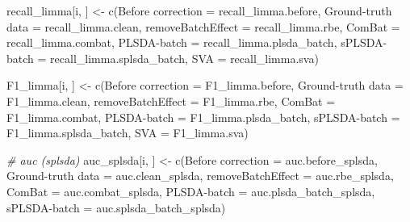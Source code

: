 \documentclass[
]{book}
\newenvironment{Shaded}{\begin{snugshade}}{\end{snugshade}}
\newcommand{\AttributeTok}[1]{\textcolor[rgb]{0.77,0.63,0.00}{#1}}
\newcommand{\CommentTok}[1]{\textcolor[rgb]{0.56,0.35,0.01}{\textit{#1}}}
\newcommand{\FunctionTok}[1]{\textcolor[rgb]{0.00,0.00,0.00}{#1}}
\newcommand{\NormalTok}[1]{#1}
\newcommand{\OtherTok}[1]{\textcolor[rgb]{0.56,0.35,0.01}{#1}}
\newcommand{\StringTok}[1]{\textcolor[rgb]{0.31,0.60,0.02}{#1}}
\begin{document}
\begin{Shaded}
\begin{Highlighting}[]
\NormalTok{  recall\_limma[i, ] }\OtherTok{\textless{}{-}} \FunctionTok{c}\NormalTok{(}\StringTok{\textasciigrave{}}\AttributeTok{Before correction}\StringTok{\textasciigrave{}} \OtherTok{=}\NormalTok{ recall\_limma.before, }
                         \StringTok{\textasciigrave{}}\AttributeTok{Ground{-}truth data}\StringTok{\textasciigrave{}} \OtherTok{=}\NormalTok{ recall\_limma.clean,}
                         \StringTok{\textasciigrave{}}\AttributeTok{removeBatchEffect}\StringTok{\textasciigrave{}} \OtherTok{=}\NormalTok{ recall\_limma.rbe,}
                         \AttributeTok{ComBat =}\NormalTok{ recall\_limma.combat,}
                         \StringTok{\textasciigrave{}}\AttributeTok{PLSDA{-}batch}\StringTok{\textasciigrave{}} \OtherTok{=}\NormalTok{ recall\_limma.plsda\_batch,}
                         \StringTok{\textasciigrave{}}\AttributeTok{sPLSDA{-}batch}\StringTok{\textasciigrave{}} \OtherTok{=}\NormalTok{ recall\_limma.splsda\_batch,}
                         \AttributeTok{SVA =}\NormalTok{ recall\_limma.sva)}
  
\NormalTok{  F1\_limma[i, ] }\OtherTok{\textless{}{-}} \FunctionTok{c}\NormalTok{(}\StringTok{\textasciigrave{}}\AttributeTok{Before correction}\StringTok{\textasciigrave{}} \OtherTok{=}\NormalTok{ F1\_limma.before, }
                     \StringTok{\textasciigrave{}}\AttributeTok{Ground{-}truth data}\StringTok{\textasciigrave{}} \OtherTok{=}\NormalTok{ F1\_limma.clean,}
                     \StringTok{\textasciigrave{}}\AttributeTok{removeBatchEffect}\StringTok{\textasciigrave{}} \OtherTok{=}\NormalTok{ F1\_limma.rbe,}
                     \AttributeTok{ComBat =}\NormalTok{ F1\_limma.combat,}
                     \StringTok{\textasciigrave{}}\AttributeTok{PLSDA{-}batch}\StringTok{\textasciigrave{}} \OtherTok{=}\NormalTok{ F1\_limma.plsda\_batch,}
                     \StringTok{\textasciigrave{}}\AttributeTok{sPLSDA{-}batch}\StringTok{\textasciigrave{}} \OtherTok{=}\NormalTok{ F1\_limma.splsda\_batch,}
                     \AttributeTok{SVA =}\NormalTok{ F1\_limma.sva)}
  
  \CommentTok{\# auc (splsda)}
\NormalTok{  auc\_splsda[i, ] }\OtherTok{\textless{}{-}} \FunctionTok{c}\NormalTok{(}\StringTok{\textasciigrave{}}\AttributeTok{Before correction}\StringTok{\textasciigrave{}} \OtherTok{=}\NormalTok{ auc.before\_splsda, }
                       \StringTok{\textasciigrave{}}\AttributeTok{Ground{-}truth data}\StringTok{\textasciigrave{}} \OtherTok{=}\NormalTok{ auc.clean\_splsda, }
                       \StringTok{\textasciigrave{}}\AttributeTok{removeBatchEffect}\StringTok{\textasciigrave{}} \OtherTok{=}\NormalTok{ auc.rbe\_splsda, }
                       \AttributeTok{ComBat =}\NormalTok{ auc.combat\_splsda, }
                       \StringTok{\textasciigrave{}}\AttributeTok{PLSDA{-}batch}\StringTok{\textasciigrave{}} \OtherTok{=}\NormalTok{ auc.plsda\_batch\_splsda, }
                       \StringTok{\textasciigrave{}}\AttributeTok{sPLSDA{-}batch}\StringTok{\textasciigrave{}} \OtherTok{=}\NormalTok{ auc.splsda\_batch\_splsda)}
  

\end{Highlighting}
\end{Shaded}
\end{document}

